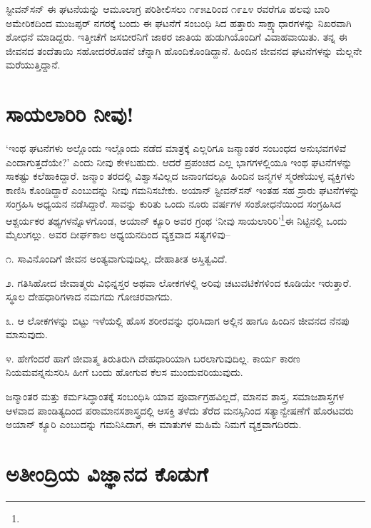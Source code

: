 ಸ್ಟೀವನ್​ಸನ್ ಈ ಘಟನೆಯನ್ನು ಆಮೂಲಾಗ್ರ ಪರಿಶೀಲಿಸಲು ೧೯೫೭ರಿಂದ ೧೯೭೪ ರವರೆಗೂ ಹಲವು ಬಾರಿ ಅಮೇರಿಕದಿಂದ ಮುಜಪ್ಫರ್ ನಗರಕ್ಕೆ ಬಂದು ಈ ಘಟನೆಗೆ ಸಂಬಂಧಿ ಸಿದ ಹತ್ತಾರು ಸಾಕ್ಷ್ಯಾಧಾರಗಳನ್ನು ನಿಖರವಾಗಿ ಶೋಧನೆ ಮಾಡಿದ್ದರು. ಇತ್ತೀಚೆಗೆ ಜಸಬೀರನಿಗೆ ಜಾಠರ ಜಾತಿಯ ಹುಡುಗಿಯೊಂದಿಗೆ ವಿವಾಹವಾಯಿತು. ತನ್ನ ಈ ಜೀವನದ ತಂದೆತಾಯಿ ಸಹೋದರರೊಡನೆ ಚೆನ್ನಾಗಿ ಹೊಂದಿಕೊಂಡಿದ್ದಾನೆ. ಹಿಂದಿನ ಜೀವನದ ಘಟನೆಗಳನ್ನು ಮೆಲ್ಲನೇ ಮರೆಯುತ್ತಿದ್ದಾನೆ.


\section{ಸಾಯಲಾರಿರಿ ನೀವು!}

‘ಇಂಥ ಘಟನೆಗಳು ಅಲ್ಲೊಂದು ಇಲ್ಲೊಂದು ನಡೆದ ಮಾತ್ರಕ್ಕೆ ಎಲ್ಲರಿಗೂ ಜನ್ಮಾಂತರ ಸಂಬಂಧದ ಅನುಭವಗಳಿವೆ ಎಂದಾಗುತ್ತದೆಯೇ?’ ಎಂದು ನೀವು ಕೇಳಬಹುದು. ಆದರೆ ಪ್ರಪಂಚದ ಎಲ್ಲ ಭಾಗಗಳಲ್ಲಿಯೂ ಇಂಥ ಘಟನೆಗಳನ್ನು ಸಾಕಷ್ಟು ಕಲೆಹಾಕಿದ್ದಾರೆ. ಜನ್ಮಾಂ ತರದಲ್ಲಿ ವಿಶ್ವಾಸವಿಲ್ಲದ ಜನಾಂಗದಲ್ಲೂ ಹಿಂದಿನ ಜನ್ಮಗಳ ಸ್ಮರಣೆಯುಳ್ಳ ವ್ಯಕ್ತಿಗಳು ಕಾಣಿಸಿ ಕೊಂಡಿದ್ದಾರೆ ಎಂಬುದನ್ನು ನೀವು ಗಮನಿಸಬೇಕು. ಅಯಾನ್ ಸ್ಟೀವನ್​ಸನ್ ಇಂತಹ ಸಹ ಸ್ರಾರು ಘಟನೆಗಳನ್ನು ಸಂಗ್ರಹಿಸಿ ಅಧ್ಯಯನ ನಡೆಸಿದ್ದಾರೆ. ಸಾವನ್ನು ಕುರಿತು ಒಂದು ನೂರು ವರ್ಷಗಳ ಸಂಶೋಧನೆಯಿಂದ ಸಂಗ್ರಹಿಸಿದ ಆಶ್ಚರ್ಯಕರ ತಥ್ಯಗಳನ್ನೊಳಗೊಂಡ, ಅಯಾನ್ ಕ್ಯೂರಿ ಅವರ ಗ್ರಂಥ ‘ನೀವು ಸಾಯಲಾರಿರಿ’\footnote{}ಈ ನಿಟ್ಟಿನಲ್ಲಿ ಒಂದು ಮೈಲುಗಲ್ಲು. ಅವರ ದೀರ್ಘಕಾಲ ಅಧ್ಯಯನದಿಂದ ವ್ಯಕ್ತವಾದ ಸತ್ಯಗಳಿವು–

೧. ಸಾವಿನೊಂದಿಗೆ ಜೀವನ ಅಂತ್ಯವಾಗುವುದಿಲ್ಲ. ದೇಹಾತೀತ ಅಸ್ತಿತ್ವವಿದೆ.

೨. ಗತಿಸಿಹೋದ ಜೀವಾತ್ಮರು ವಿಭಿನ್ನಸ್ತರ ಅಥವಾ ಲೋಕಗಳಲ್ಲಿ ಅರಿವು ಚಟುವಟಿಕೆಗಳಿಂದ ಕೂಡಿಯೇ ಇರುತ್ತಾರೆ. ಸ್ಥೂಲ ದೇಹಧಾರಿಗಳಾದ ನಮಗದು ಗೋಚರವಾಗದು.

೩. ಆ ಲೋಕಗಳನ್ನು ಬಿಟ್ಟು ಇಳೆಯಲ್ಲಿ ಹೊಸ ಶರೀರವನ್ನು ಧರಿಸಿದಾಗ ಅಲ್ಲಿನ ಹಾಗೂ ಹಿಂದಿನ ಜೀವನದ ನೆನಪು ಮಾಸುವುದು.

೪. ಹೇಗೆಂದರೆ ಹಾಗೆ ಜೀವಾತ್ಮ ತಿರುತಿರುಗಿ ದೇಹಧಾರಿಯಾಗಿ ಬರಲಾಗುವುದಿಲ್ಲ. ಕಾರ್ಯ ಕಾರಣ ನಿಯಮವನ್ನನುಸರಿಸಿ ಹೀಗೆ ಬಂದು ಹೋಗುವ ಕೆಲಸ ಮುಂದುವರಿಯುವುದು.

ಜನ್ಮಾಂತರ ಮತ್ತು ಕರ್ಮಸಿದ್ಧಾಂತಕ್ಕೆ ಸಂಬಂಧಿಸಿ ಯಾವ ಪೂರ್ವಾಗ್ರಹವಿಲ್ಲದೆ, ಮಾನವ ಶಾಸ್ತ್ರ, ಸಮಾಜಶಾಸ್ತ್ರಗಳ ಆಳವಾದ ಪಾಂಡಿತ್ಯದಿಂದ ಪರಾಮಾನಸಶಾಸ್ತ್ರದಲ್ಲಿ ಆಸಕ್ತಿ ತಳೆದು ತೆರೆದ ಮನಸ್ಸಿನಿಂದ ಸತ್ಯಾನ್ವೇಷಣೆಗೆ ಹೊರಟವರು ಅಯಾನ್ ಕ್ಯೂರಿ ಎಂಬುದನ್ನು ಗಮನಿಸಿದಾಗ, ಈ ಮಾತುಗಳ ಮಹಿಮೆ ನಿಮಗೆ ವ್ಯಕ್ತವಾಗದಿರದು.


\section{ಅತೀಂದ್ರಿಯ ವಿಜ್ಞಾನದ ಕೊಡುಗೆ}

